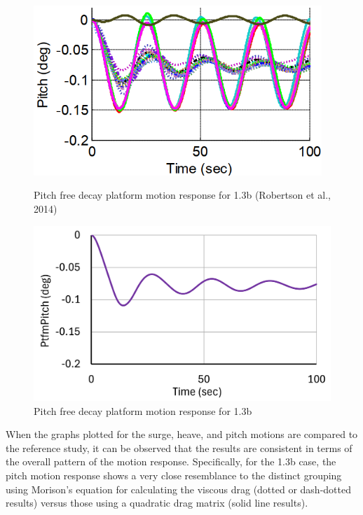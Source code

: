 \documentclass[a4paper, 11pt]{article}
\begin{document}
\begin{figure}[H]
    \begin{minipage}{0.47\textwidth}
        \centering
        \includegraphics[width=0.97\textwidth]{1.3b_pitch.png}
        \caption{\small Pitch free decay platform motion response for 1.3b (Robertson et al., 2014)}
        \label{fig:1.3b_pitch}
    \end{minipage}
    \hfill
    \begin{minipage}{0.5\textwidth}
        \centering
        \vspace{-0.3cm}
        \includegraphics[width=1\textwidth]{1.3b_pitch_mine.png}
        \caption{\small Pitch free decay platform motion response for 1.3b}
        \label{fig:1.3b_pitch_mine}
    \end{minipage}
\end{figure}

When the graphs plotted for the surge, heave, and pitch motions are compared to the reference study, it can be observed that the results are consistent in terms of the overall pattern of the motion response. Specifically, for the 1.3b case, the pitch motion response shows a very close resemblance to the distinct grouping using Morison’s equation for calculating the viscous drag (dotted or dash-dotted results) versus those using a quadratic drag matrix (solid line results).
\end{document}
